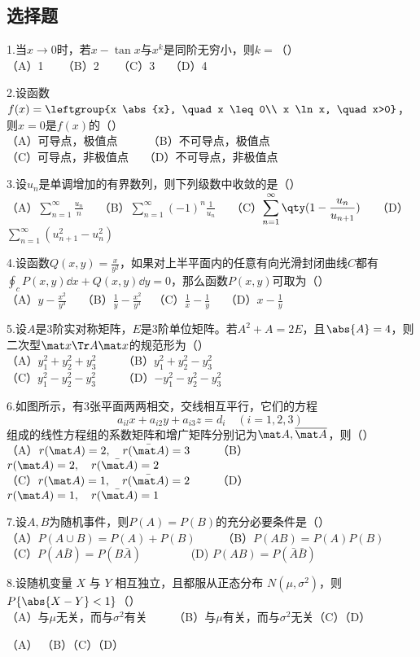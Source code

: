 
\subsection{选择题}
1.当$x \to 0$时，若$x-\tan x$与$x^k$是同阶无穷小，则$k=$（）\\
（A）1 $ \quad$ （B）2 $\quad$ （C）3  $\quad$（D）4 $\quad$

2.设函数$f(x)=\leftgroup{x \abs{x}, \quad x \leq 0\\ x \ln x, \quad x>0}$，则$x=0$是$f(x)$的（）\\
（A）可导点，极值点 $ \qquad$ （B）不可导点，极值点 \\
（C）可导点，非极值点  $\quad$（D）不可导点，非极值点 

3.设${u_n}$是单调增加的有界数列，则下列级数中收敛的是（）\\
（A）$\displaystyle \sum_{n=1}^\infty \frac{u_n}{n} \quad$ 
（B）$\displaystyle \sum_{n=1}^\infty (-1)^n \frac{1}{u_n} \quad$
（C）$\displaystyle \sum_{n=1}^\infty \qty (1- \frac{u_n}{u_{n+1}}) \quad$ 
（D）$\displaystyle \sum_{n=1}^\infty (u_{n+1}^2-u_n ^2)$

4.设函数$Q(x,y)=\frac{x}{y^2}$，如果对上半平面内的任意有向光滑封闭曲线$C$都有$\oint_c P(x,y)\dd{x}+Q(x,y)\dd{y}=0$，那么函数$P(x,y)$可取为（）\\
（A）$ \displaystyle y-\frac{x^2}{y^3} \quad$ （B）$\displaystyle \frac{1}{y}-\frac{x^2}{y^3}\quad$（C）$ \displaystyle \frac{1}{x}-\frac{1}{y}\quad$ （D）$ \displaystyle x-\frac{1}{y}\quad$

5.设$A$是3阶实对称矩阵，$E$是3阶单位矩阵。若$A^2 + A=2E$，且$\abs{A}=4$，则二次型$\mat x\Tr A \mat x$的规范形为（）\\
（A）$y_1 ^2+y_2 ^2 +y_3 ^2 \qquad$  （B）$y_1 ^2+y_2 ^2 -y_3 ^2$ \\ 
（C）$y_1 ^2-y_2 ^2 -y_3 ^2 \qquad$  （D）$-y_1 ^2-y_2 ^2 -y_3 ^2$


6.如图所示，有3张平面两两相交，交线相互平行，它们的方程$$a_{il}x + a_{i2}y + a_{i3}z = d_i \quad (i=1,2,3)~$$组成的线性方程组的系数矩阵和增广矩阵分别记为$\mat A , \overline{ \mat A} $，则（）\\
（A）$r(\mat A)=2,\quad r(\bar{\mat A})=3 \qquad$ 
（B）$r(\mat A)=2,\quad r(\bar{\mat A})=2 \qquad$\\
（C）$r(\mat A)=1,\quad r(\bar{\mat A})=2 \qquad$ 
（D）$r(\mat A)=1,\quad r(\bar{\mat A})=1 \qquad$ 

7.设$A,B$为随机事件，则$P(A)=P(B)$的充分必要条件是（）\\
（A）$P( A \cup B)=P(A)+P(B) \qquad$  （B）$P(AB)=P(A)P(B)$\\
（C）$P(A\bar{ B })=P(B\bar{A}) \qquad \qquad$  (D) $P(AB)=P(\bar {A}\bar {B})$ 

8.设随机变量 $X$ 与 $Y$ 相互独立，且都服从正态分布 $N(\mu,\sigma ^2)$，则$P \{\abs{X-Y}<1\}$（）\\
（A）与$\mu$无关，而与$\sigma ^2$有关 $\qquad$（B）与$\mu$有关，而与$\sigma ^2$无关（C）（D）



（A） （B）（C）（D）